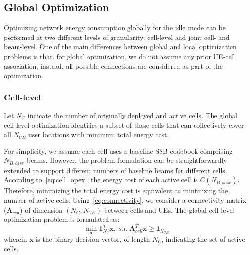 \subsection{Global Optimization}
Optimizing network energy consumption globally for the idle mode can be performed at two different levels of granularity: cell-level and joint cell- and beam-level. One of the main differences between global and local optimization problems is that, for global optimization, we do not assume any prior UE-cell association; instead, all possible connections are considered as part of the optimization.

\subsubsection{Cell-level}
Let $N_C$ indicate the number of originally deployed and active cells. The global cell-level optimization identifies a subset of these cells that can collectively cover all $N_{UE}$ user locations with minimum total energy cost.

For simplicity, we assume each cell uses a baseline SSB codebook comprising $N_{B,base}$ beams. However, the problem formulation can be straightforwardly extended to support different numbers of baseline beams for different cells. According to~\eqref{eq:cell_opex}, the energy cost of each active cell is $C(N_{B,base})$. Therefore, minimizing the total energy cost is equivalent to minimizing the number of active cells. Using~\eqref{eq:connectivity}, we consider a connectivity matrix ($\bm{A}_{cell}$) of dimension $(N_C, N_{UE})$ between cells and UEs. The global cell-level optimization problem is formulated as:
\begin{equation}\label{eq:problem_sc}
    \min_{\bm{x}} \bm{1}_{N_C}^T\bm{x}, ~s.t. ~ {\bm{A}_{cell}^T}\bm{x} \ge \bm{1}_{N_{UE}}
\end{equation}
wherein  $\bm{x}$ is the binary decision vector, of length $N_C$, indicating the set of active cells.
 
